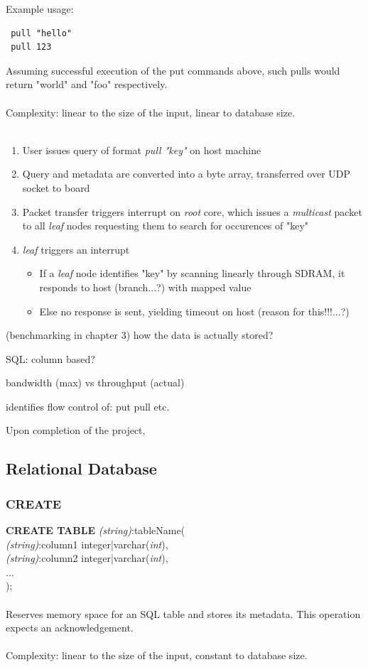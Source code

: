 \noindent
 Example usage:\\
 \begin{lstlisting}
 pull "hello"
 pull 123
 \end{lstlisting}
 Assuming successful execution of the put commands above, such pulls would return "world" and "foo" respectively.\\\\
 Complexity: linear to the size of the input, linear to database size.\\\\

\begin{enumerate}
\item User issues query of format \textit{pull "key"} on host machine
\item Query and metadata are converted into a byte array, transferred over UDP socket to board
\item Packet transfer triggers interrupt on \textit{root} core, which issues a \textit{multicast} packet to all \textit{leaf} nodes requesting them to search for occurences of "key"
\item \textit{leaf} triggers an interrupt
\begin{itemize}
\item If a \textit{leaf} node identifies "key" by scanning linearly through SDRAM, it responds to host (branch...?) with mapped value
\item Else no response is sent, yielding timeout on host (reason for this!!!...?)
\end{itemize}
\end{enumerate}


(benchmarking in chapter 3)
how the data is actually stored?

SQL:
column based?

bandwidth (max) vs throughput (actual)


identifies
flow control of:
put
pull
etc.

Upon completion of the project, 


\subsection{Relational Database}

\subsubsection{CREATE }
\noindent 
  {\large\textbf{CREATE TABLE} \textit{(string)}:tableName(\\
  	\textit{(string)}:column1 integer|varchar(\textit{int}),\\
  	\textit{(string)}:column2 integer|varchar(\textit{int}),\\
  	...\\
  	);}\\\\
\noindent
  Reserves memory space for an SQL table and stores its metadata. This operation expects an acknowledgement.\\\\
   Complexity: linear to the size of the input, constant to database size.\\\\
   

